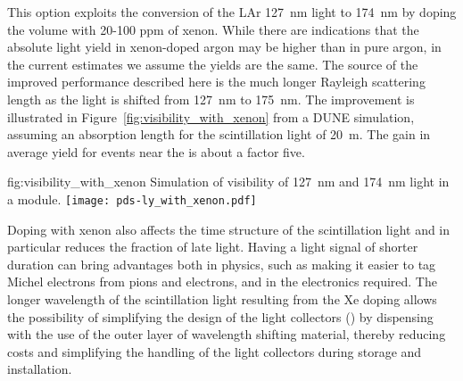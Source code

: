

This option exploits the conversion of the LAr \SI{127}{nm} light to \SI{174}{nm} by doping the \lar volume with 20-100 ppm of xenon.  While there are indications that the absolute light yield in xenon-doped argon may be higher than in pure argon, in the current estimates we assume the yields are the same. The source of the improved performance described here is the much longer Rayleigh scattering length as the light is shifted from \SI{127}{nm} to \SI{175}{nm}.  The improvement is illustrated in Figure~\ref{fig:visibility_with_xenon} from a DUNE  simulation, assuming an absorption length for the scintillation light of \SI{20}{m}. The gain in average yield for events near the  is about a factor five.

\begin{dunefigure}
{fig:visibility_with_xenon}
{Simulation of visibility of \SI{127}{nm} and \SI{174}{nm} light in a  module.}
\texttt{[image: pds-ly\_with\_xenon.pdf]}
\end{dunefigure}

Doping with xenon also affects the time structure of the scintillation light and in particular reduces the fraction of late light.  Having a light signal of shorter duration can bring advantages both in physics, such as making it easier to tag Michel electrons from pions and electrons, and in the electronics required. The longer wavelength of the scintillation light resulting from the Xe doping allows the possibility of simplifying the design of the  light collectors () by dispensing with the use of the outer layer of wavelength shifting material, thereby reducing costs and simplifying the handling of the light collectors during storage and installation. 


